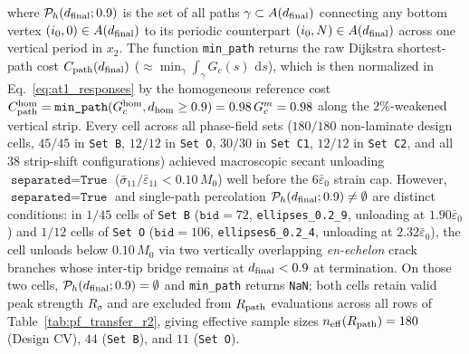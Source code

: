 \documentclass[preprint,11pt,a4paper]{elsarticle}
\newcommand{\dd}{\,\mathrm d}
\begin{document}
where $\mathcal P_h(d_{\rm final};0.9)$ is the set of all paths $\gamma\subset A(d_{\rm final})$ connecting any bottom vertex $(i_0,0)\in A(d_{\rm final})$ to its periodic counterpart $(i_0,N)\in A(d_{\rm final})$ across one vertical period in $x_2$. The function \texttt{min\_path} returns the raw Dijkstra shortest-path cost $C_{\rm path}(d_{\rm final})$ ($\approx\min_\gamma\int_\gamma G_c(s)\,\dd s$), which is then normalized in Eq.~\eqref{eq:at1_responses} by the homogeneous reference cost $C_{\rm path}^{\rm hom}=\texttt{min\_path}(G_c^{\rm hom},d_{\rm hom}\ge 0.9)=0.98\,G_c^m=0.98$ along the $2\%$-weakened vertical strip. Every cell across all phase-field sets ($180/180$ non-laminate design cells, $45/45$ in \texttt{Set B}, $12/12$ in \texttt{Set O}, $30/30$ in \texttt{Set C1}, $12/12$ in \texttt{Set C2}, and all $38$ strip-shift configurations) achieved macroscopic secant unloading $\texttt{separated}=\texttt{True}$ ($\bar\sigma_{11}/\bar\varepsilon_{11}<0.10\,M_0$) well before the $6\bar\varepsilon_0$ strain cap. However, $\texttt{separated}=\texttt{True}$ and single-path percolation $\mathcal P_h(d_{\rm final};0.9)\ne\emptyset$ are distinct conditions: in $1/45$ cells of \texttt{Set B} ($\texttt{bid}=72$, \texttt{ellipses\_0.2\_9}, unloading at $1.90\bar\varepsilon_0$) and $1/12$ cells of \texttt{Set O} ($\texttt{bid}=106$, \texttt{ellipses6\_0.2\_4}, unloading at $2.32\bar\varepsilon_0$), the cell unloads below $0.10\,M_0$ via two vertically overlapping \emph{en-echelon} crack branches whose inter-tip bridge remains at $d_{\rm final}<0.9$ at termination. On those two cells, $\mathcal P_h(d_{\rm final};0.9)=\emptyset$ and \texttt{min\_path} returns \texttt{NaN}; both cells retain valid peak strength $R_\sigma$ and are excluded from $R_{\rm path}$ evaluations across all rows of Table~\ref{tab:pf_transfer_r2}, giving effective sample sizes $n_{\rm eff}(R_{\rm path})=180$ (Design CV), $44$ (\texttt{Set B}), and $11$ (\texttt{Set O}).
\end{document}
